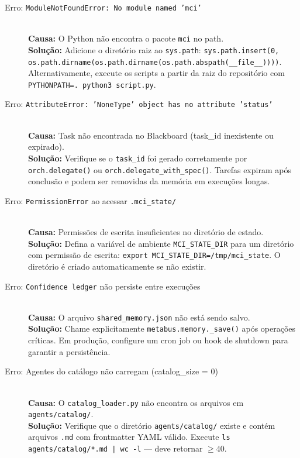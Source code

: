 \begin{description}
  \item[Erro: \texttt{ModuleNotFoundError: No module named 'mci'}] \hfill \\
  \textbf{Causa:} O Python não encontra o pacote \texttt{mci} no path. \\
  \textbf{Solução:} Adicione o diretório raiz ao \texttt{sys.path}: \texttt{sys.path.insert(0, os.path.dirname(os.path.dirname(os.path.abspath(\_\_file\_\_))))}. Alternativamente, execute os scripts a partir da raiz do repositório com \texttt{PYTHONPATH=. python3 script.py}.
  
  \item[Erro: \texttt{AttributeError: 'NoneType' object has no attribute 'status'}] \hfill \\
  \textbf{Causa:} Task não encontrada no Blackboard (task\_id inexistente ou expirado). \\
  \textbf{Solução:} Verifique se o \texttt{task\_id} foi gerado corretamente por \texttt{orch.delegate()} ou \texttt{orch.delegate\_with\_spec()}. Tarefas expiram após conclusão e podem ser removidas da memória em execuções longas.
  
  \item[Erro: \texttt{PermissionError} ao acessar \texttt{.mci\_state/}] \hfill \\
  \textbf{Causa:} Permissões de escrita insuficientes no diretório de estado. \\
  \textbf{Solução:} Defina a variável de ambiente \texttt{MCI\_STATE\_DIR} para um diretório com permissão de escrita: \texttt{export MCI\_STATE\_DIR=/tmp/mci\_state}. O diretório é criado automaticamente se não existir.
  
  \item[Erro: \texttt{Confidence ledger} não persiste entre execuções] \hfill \\
  \textbf{Causa:} O arquivo \texttt{shared\_memory.json} não está sendo salvo. \\
  \textbf{Solução:} Chame explicitamente \texttt{metabus.memory.\_save()} após operações críticas. Em produção, configure um cron job ou hook de shutdown para garantir a persistência.
  
  \item[Erro: Agentes do catálogo não carregam (catalog\_size = 0)] \hfill \\
  \textbf{Causa:} O \texttt{catalog\_loader.py} não encontra os arquivos em \texttt{agents/catalog/}. \\
  \textbf{Solução:} Verifique que o diretório \texttt{agents/catalog/} existe e contém arquivos \texttt{.md} com frontmatter YAML válido. Execute \texttt{ls agents/catalog/*.md | wc -l} — deve retornar $\ge 40$.
\end{description}

